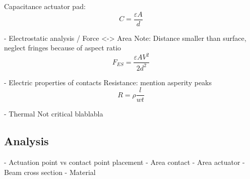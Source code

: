 Capacitance actuator pad:
\begin{equation}
	C = \frac{\varepsilon A}{d}
	\label{eq:plate_capacitor}
\end{equation}

- Electrostatic analysis / Force <-> Area
Note: Distance smaller than surface, neglect fringes because of aspect ratio
\begin{equation}
	F_{ES} = \frac{\varepsilon AV^2}{2d^2}
	\label{eq:electrostatic_force}
\end{equation}

- Electric properties of contacts
Resistance:
mention asperity peaks
\begin{equation}
	R = \rho\frac{l}{wt}
	\label{eq:resistance}
\end{equation}

- Thermal
Not critical blablabla 

\subsection{Analysis}
\label{sec:analysis}
- Actuation point vs contact point placement
- Area contact
- Area actuator
- Beam cross section
- Material
